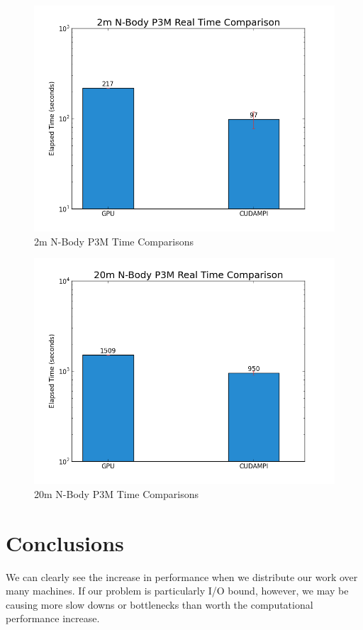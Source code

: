 \documentclass{acm_proc_article-sp}
\begin{document}
\begin{figure}
\includegraphics[scale=0.4]{2m_bar_chart.png}
\caption{2m N-Body P3M Time Comparisons}
\end{figure}

\begin{figure}
\includegraphics[scale=0.4]{20m_bar_chart.png}
\caption{20m N-Body P3M Time Comparisons}
\end{figure}

\section{Conclusions}

We can clearly see the increase in performance when we distribute our work over
many machines. If our problem is particularly I/O bound, however, we may be
causing more slow downs or bottlenecks than worth the computational performance
increase.
\end{document}
